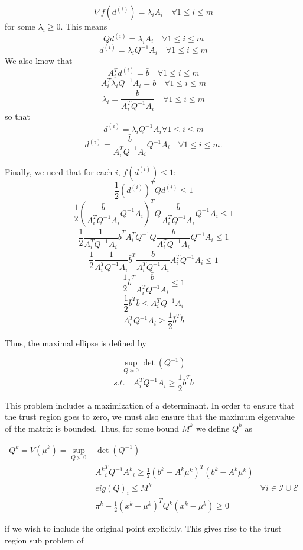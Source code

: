 

\[
\nabla f(d^{(i)}) = \lambda_i A_i \quad \forall 1\le i\le m
\]
for some $\lambda_i \ge 0$.
This means
\[
Q d^{(i)} = \lambda_i A_i \quad \forall 1\le i\le m
\]
\[
d^{(i)} = \lambda_i Q^{-1}A_i \quad \forall 1\le i\le m
\]
We also know that 
\[
A_i^T d^{(i)} = \bar{b} \quad \forall 1\le i\le m
\]
\[
A_i^T \lambda_i Q^{-1}A_i = \bar{b} \quad \forall 1\le i\le m
\]
\[
\lambda_i = \frac {\bar{b}}{A_i^T  Q^{-1}A_i} \quad \forall 1\le i\le m
\]
so that 
\[
d^{(i)} = \lambda_i Q^{-1}A_i \forall 1\le i\le m
\]
\[
d^{(i)} = \frac {\bar{b}}{A_i^T  Q^{-1}A_i}  Q^{-1}A_i \quad \forall 1\le i\le m.
\]

Finally, we need that for each $i$, $f(d^{(i)}) \le 1$:
\[
\frac 1 2 (d^{(i)})^{T} Q d^{(i)} \le 1
\]
\[
\frac 1 2 (\frac {\bar{b}}{A_i^T  Q^{-1}A_i}  Q^{-1}A_i)^{T} Q \frac {\bar{b}}{A_i^T  Q^{-1}A_i}  Q^{-1}A_i \le 1
\]
\[
\frac 1 2 \frac {1}{A_i^T  Q^{-1}A_i}  \bar{b}^T A_i^T Q^{-1} Q \frac {\bar{b}}{A_i^T  Q^{-1}A_i}  Q^{-1}A_i \le 1
\]
\[
\frac 1 2 \frac {1}{A_i^T  Q^{-1}A_i}  \bar{b}^T \frac {\bar{b}}{A_i^T  Q^{-1}A_i}  A_i^T Q^{-1}A_i \le 1
\]
\[
\frac 1 2 \bar{b}^T \frac {\bar{b}}{A_i^T  Q^{-1}A_i} \le 1
\]
\[
\frac 1 2 \bar{b}^T \bar{b}\le A_i^T  Q^{-1}A_i
\]
\[
A_i^T  Q^{-1}A_i \ge \frac 1 2 \bar{b}^T \bar{b}
\]

Thus, the maximal ellipse is defined by

\[
\sup_{Q \succeq 0} \det(Q^{-1})
\]
\[
s.t. \quad A_i^T Q^{-1} A_i \ge \frac 1 2 \bar{b}^T\bar{b}
\]


This problem includes a maximization of a determinant.
In order to ensure that the trust region goes to zero, we must also ensure that the maximum eigenvalue of the matrix is bounded.
Thus, for some bound $M^k$ we define $Q^k$ as

\begin{center}
\begin{align}
\label{ellipse_1}
Q^k = V(\mu^k) = \sup_{Q \succ 0} & \det(Q^{-1}) & \\
  & {A^k}_i^T Q^{-1} {A^k}_i \ge \frac 1 2 (b^k - A^k\mu^{k})^T(b^k - A^k \mu^{k}) & \\
  & eig(Q)_i \le M^k & \forall i \in \mathcal I \cup \mathcal E \\
  & \pi^k - \frac 1 2 (x^k - \mu^{k})^TQ^{k}(x^k - \mu^{k}) \ge 0
\end{align}
\end{center}

if we wish to include the original point explicitly.
This gives rise to the trust region sub problem of

